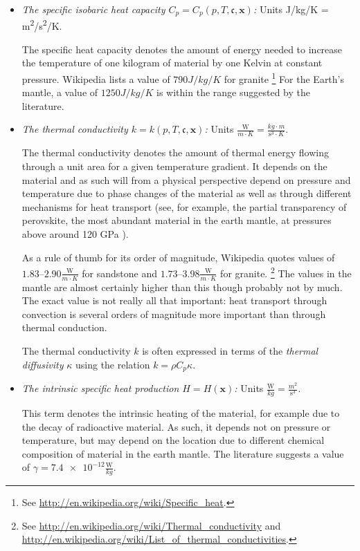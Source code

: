 \documentclass{article}
\begin{document}
\begin{itemize}
\item \textit{The specific isobaric heat capacity $C_p=C_p(p,T,\mathfrak c,\mathbf x)$:}
Units \si{J/kg/K} = \si{m^2/s^2/K}.

  The specific heat capacity denotes the amount of energy needed to increase
  the temperature of one kilogram of material by one Kelvin at constant pressure.
  Wikipedia lists a value of
  $790 \si{J/kg/K}$ for granite%
  \footnote{See \url{http://en.wikipedia.org/wiki/Specific_heat}.}
  For the Earth's mantle, a value of $1250
  \si{J/kg/K}$ is within the range
  suggested by the literature.


\item \textit{The thermal conductivity $k=k(p,T,\mathfrak c,\mathbf x)$:} Units
  $\frac{\textrm{W}}{\si{m}\cdot\si{K}}=\frac{\si{kg}\cdot\si{m}}{\textrm{s}^3\cdot\si{K}}$.

  The thermal conductivity denotes the amount of thermal energy flowing
  through a unit area for a given temperature gradient. It depends on the
  material and as such will from a physical perspective depend on pressure and
  temperature due to phase changes of the material as well as through
  different mechanisms for heat transport (see, for example, the partial
  transparency of perovskite, the most abundant
  material in the earth mantle, at pressures above around 120 GPa
  \cite{BRVMFG04}).

  As a rule of thumb for its
  order of magnitude, Wikipedia quotes values of
  $1.83$--$2.90\frac{\textrm{W}}{\si{m}\cdot\si{K}}$ for sandstone and
  $1.73$--$3.98\frac{\textrm{W}}{\si{m}\cdot\si{K}}$ for granite.%
  \footnote{See \url{http://en.wikipedia.org/wiki/Thermal_conductivity} and
    \url{http://en.wikipedia.org/wiki/List_of_thermal_conductivities}.} The
  values in the mantle are almost certainly higher than this though probably
  not by much. The exact value is not really all that important: heat
  transport through convection is several orders of magnitude more important
  than through thermal conduction.

  The thermal conductivity $k$ is often expressed in terms of the
  \textit{thermal diffusivity} $\kappa$ using the relation $k = \rho C_p \kappa$.

\item \textit{The intrinsic specific heat production $H=H(\mathbf x)$:} Units
  $\frac{\textrm{W}}{\si{kg}}=\frac{\si{m}^2}{\textrm{s}^3}$.

  This term denotes the intrinsic heating of the material, for example due to
  the decay of radioactive material. As such, it depends not on pressure or
  temperature, but may depend on the location due to different chemical
  composition of material in the earth mantle. The literature suggests a value
  of $\gamma=\num{7.4e-12}\frac{\textrm{W}}{\si{kg}}$.


\end{itemize}
\end{document}

